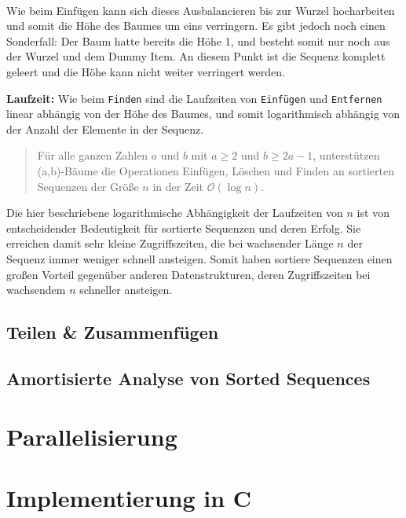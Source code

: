 \\
Wie beim Einfügen kann sich dieses Ausbalancieren bis zur Wurzel hocharbeiten und somit die Höhe des Baumes um eins verringern. Es gibt jedoch noch einen Sonderfall: Der Baum hatte bereits die Höhe 1, und besteht somit nur noch aus der Wurzel und dem Dummy Item. An diesem Punkt ist die Sequenz komplett geleert und die Höhe kann nicht weiter verringert werden.
\par
\textbf{Laufzeit: } Wie beim \texttt{Finden} sind die Laufzeiten von \texttt{Einfügen} und \texttt{Entfernen} linear abhängig von der Höhe des Baumes, und somit logarithmisch abhängig von der Anzahl der Elemente in der Sequenz.
\begin{quote}
    Für alle ganzen Zahlen $a$ und $b$ mit $a \geq 2$ und $b \geq 2 a - 1$, unterstützen (a,b)-Bäume die Operationen Einfügen, Löschen und Finden an sortierten Sequenzen der Größe $n$ in der Zeit $\mathcal{O}(\log n).$
        \hfill \cite{Sanders:19}
\end{quote}
Die hier beschriebene logarithmische Abhängigkeit der Laufzeiten von $n$ ist von entscheidender Bedeutigkeit für sortierte Sequenzen und deren Erfolg. Sie erreichen damit sehr kleine Zugriffszeiten, die bei wachsender Länge $n$ der Sequenz immer weniger schnell ansteigen. Somit haben sortiere Sequenzen einen großen Vorteil gegenüber anderen Datenstrukturen, deren Zugriffszeiten bei wachsendem $n$ schneller ansteigen.

\section{Teilen \& Zusammenfügen}
\label{section:split-merge}



\section{Amortisierte Analyse von Sorted Sequences}
\label{section:analyse}



\chapter{Parallelisierung}
\label{chapter:Parallelisierung}



\chapter{Implementierung in C}
\label{chapter:implementierung}
